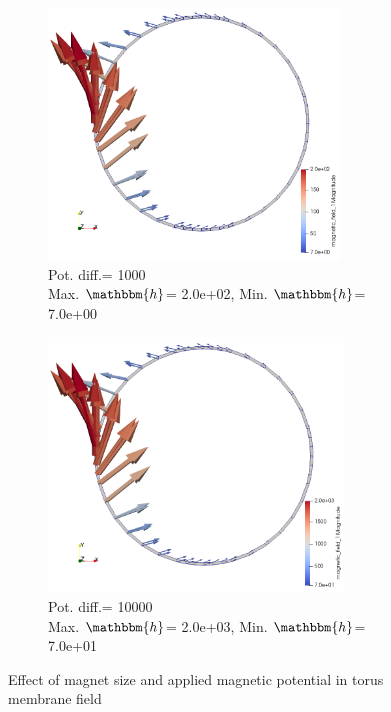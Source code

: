 \documentclass[11pt,a4paper,final]{article}
\begin{document}
\begin{figure}[h]
\begin{subfigure}{0.33\textwidth}
\includegraphics[width=0.85\textwidth]{2x_p.png}
\caption{\scriptsize Pot. diff.= 1000 \\ Max. $\mathbbm{h}$= 2.0e+02, Min. $\mathbbm{h}$= 7.0e+00}
\label{fig:1.5.5}
\end{subfigure}
\begin{subfigure}{0.33\textwidth}
\centering
\includegraphics[width=0.86\textwidth]{2x_10p.png}
\caption{\scriptsize Pot. diff.= 10000 \\ Max. $\mathbbm{h}$= 2.0e+03, Min. $\mathbbm{h}$= 7.0e+01}
\label{fig:1.5.6}
\end{subfigure}
\caption{Effect of magnet size and applied magnetic potential in torus membrane field}
\label{fig:1.5}
\end{figure}
\end{document}
